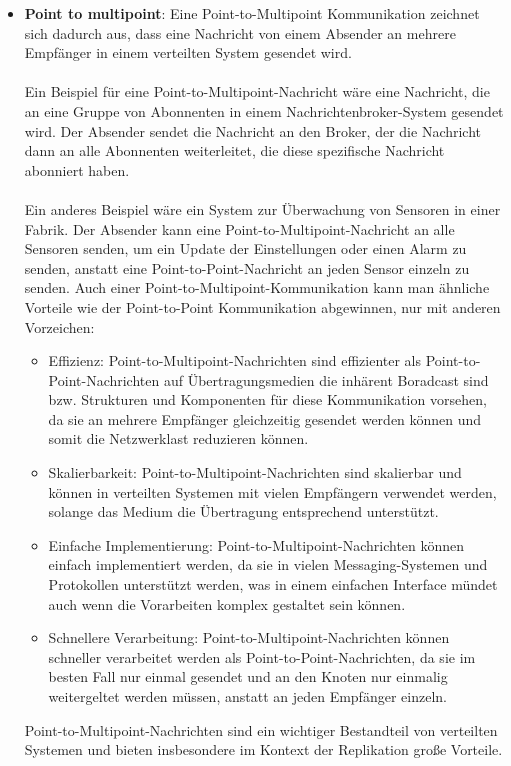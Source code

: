 \begin{itemize}
\item \textbf{Point to multipoint}: Eine Point-to-Multipoint Kommunikation zeichnet sich dadurch aus, dass eine Nachricht von einem Absender an mehrere Empfänger in einem verteilten System gesendet wird. 
\\\\
Ein Beispiel für eine Point-to-Multipoint-Nachricht wäre eine Nachricht, die an eine Gruppe von Abonnenten in einem Nachrichtenbroker-System gesendet wird. Der Absender sendet die Nachricht an den Broker, der die Nachricht dann an alle Abonnenten weiterleitet, die diese spezifische Nachricht abonniert haben.
\\\\
Ein anderes Beispiel wäre ein System zur Überwachung von Sensoren in einer Fabrik. Der Absender kann eine Point-to-Multipoint-Nachricht an alle Sensoren senden, um ein Update der Einstellungen oder einen Alarm zu senden, anstatt eine Point-to-Point-Nachricht an jeden Sensor einzeln zu senden.  Auch einer Point-to-Multipoint-Kommunikation kann man ähnliche Vorteile wie der Point-to-Point Kommunikation abgewinnen, nur mit anderen Vorzeichen:
\begin{itemize}
\item Effizienz: Point-to-Multipoint-Nachrichten sind effizienter als Point-to-Point-Nachrichten auf Übertragungsmedien die inhärent Boradcast sind bzw. Strukturen und Komponenten für diese Kommunikation vorsehen, da sie an mehrere Empfänger gleichzeitig gesendet werden können und somit die Netzwerklast reduzieren können.
\item Skalierbarkeit: Point-to-Multipoint-Nachrichten sind skalierbar und können in verteilten Systemen mit vielen Empfängern verwendet werden, solange das Medium die Übertragung entsprechend unterstützt.
\item Einfache Implementierung: Point-to-Multipoint-Nachrichten können einfach implementiert werden, da sie in vielen Messaging-Systemen und Protokollen unterstützt werden, was in einem einfachen Interface mündet auch wenn die Vorarbeiten komplex gestaltet sein können.
\item Schnellere Verarbeitung: Point-to-Multipoint-Nachrichten können schneller verarbeitet werden als Point-to-Point-Nachrichten, da sie im besten Fall nur einmal gesendet und an den Knoten nur einmalig weitergeltet werden müssen, anstatt an jeden Empfänger einzeln.
\end{itemize}
Point-to-Multipoint-Nachrichten sind ein wichtiger Bestandteil von verteilten Systemen und bieten insbesondere im Kontext der Replikation große Vorteile.

\end{itemize}
